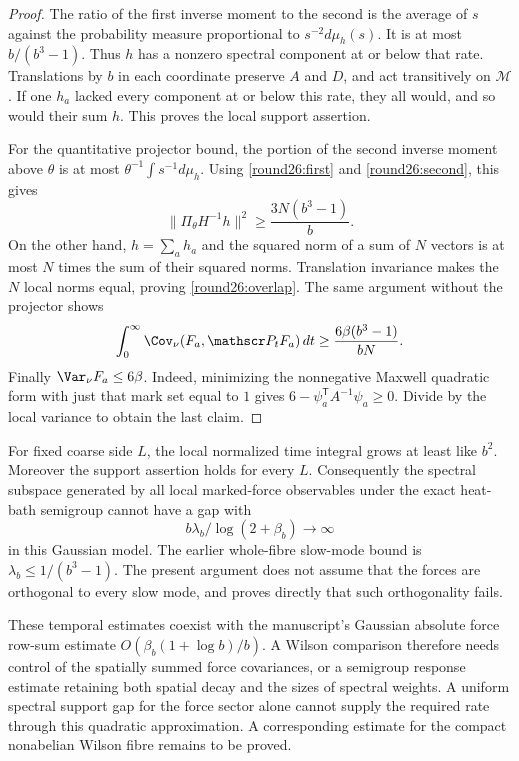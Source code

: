 \begin{proof}
The ratio of the first inverse moment to the second is the average of
$s$ against the probability measure proportional to $s^{-2}d\mu_h(s)$.
It is at most $b/(b^3-1)$. Thus $h$ has a nonzero spectral component at
or below that rate. Translations by $b$ in each coordinate preserve $A$
and $D$, and act transitively on $\mathcal M$. If one $h_a$ lacked every
component at or below this rate, they all would, and so would their sum
$h$. This proves the local support assertion.

For the quantitative projector bound, the portion of the second inverse
moment above $\theta$ is at most $\theta^{-1}\int s^{-1}d\mu_h$.
Using \eqref{round26:first} and \eqref{round26:second}, this gives
\[
 \|\Pi_\theta H^{-1}h\|^2\ge\frac{3N(b^3-1)}b.
\]
On the other hand, $h=\sum_a h_a$ and the squared norm of a sum of $N$
vectors is at most $N$ times the sum of their squared norms.
Translation invariance makes the $N$ local norms equal, proving
\eqref{round26:overlap}.
The same argument without the projector shows
\[
 \int_0^\infty\Cov_\nu(F_a,\mathscr P_tF_a)\,dt
    \ge\frac{6\beta(b^3-1)}{bN}.
\]
Finally $\Var_\nu F_a\le6\beta$. Indeed, minimizing the nonnegative
Maxwell quadratic form with just that mark set equal to $1$ gives
$6-\psi_a^{\mathsf T}A^{-1}\psi_a\ge0$. Divide by the local variance to
obtain the last claim.
\end{proof}

For fixed coarse side $L$, the local normalized time integral grows at
least like $b^2$. Moreover the support assertion holds for every $L$.
Consequently the spectral subspace generated by all local marked-force
observables under the exact heat-bath semigroup cannot have a gap with
\[
 b\lambda_b/\log(2+\beta_b)\longrightarrow\infty
\]
in this Gaussian model. The earlier whole-fibre slow-mode bound is
$\lambda_b\le1/(b^3-1)$. The present argument does not assume that the
forces are orthogonal to every slow mode, and proves directly that such
orthogonality fails.

These temporal estimates coexist with the manuscript's Gaussian
absolute force row-sum estimate $O(\beta_b(1+\log b)/b)$. A Wilson
comparison therefore needs control of the spatially summed force
covariances, or a semigroup response estimate retaining both spatial
decay and the sizes of spectral weights. A uniform spectral
support gap for the force sector alone cannot supply the required rate
through this quadratic approximation. A corresponding estimate for the
compact nonabelian Wilson fibre remains to be proved.

